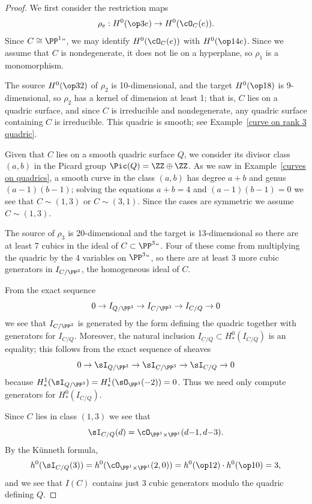 \begin{proof}
We first consider the restriction maps
$$
\rho_e: H^0(\op3e)\to H^0(\cO_C(e)).
$$
Since $C\cong \PP^1` `$,
we may identify $H^0(\cO_C(e))$ with
$H^0(\op1{4e})$.
 Since we assume that $C$ is nondegenerate, it does not lie on a hyperplane,
 so  $\rho_1$ is a monomorphism.

The source $H^0(\op32)$ of $\rho_2$ is 10-dimensional, and the target $H^0(\op18)$ is
9-dimensional, so $\rho_2$ has a kernel of dimension at least 1; that is, $C$ lies on
a quadric surface, and since $C$ is irreducible and nondegenerate, any quadric surface containing
$C$ is irreducible. This quadric is smooth;
see Example~\ref{curve on rank 3 quadric}.


Given that $C$ lies on a smooth quadric surface $Q$, we consider its divisor class $(a,b)$ in the
Picard group $\Pic(Q) = \ZZ\oplus \ZZ$. As we saw in Example~\ref{curves on quadrics}, a smooth curve
in the class $(a,b)$ has degree $a+b$ and genus $(a{-}1)(b{-}1)$;
solving the equations $a+b=4$
and
$(a{-}1)(b{-}1)=0$ we see that $C\sim (1,3)$ or $C\sim (3,1)$. Since the cases
are symmetric we assume $C\sim(1,3)$.

The source of $\rho_3$ is 20-dimensional and the target is
13-dimensional so there are at least 7
cubics in the ideal of $C\subset \PP^3` `$. Four of these come from multiplying the quadric
by the 4 variables on $\PP^3` `$, so there are at least 3 more cubic generators in $I_{C/\PP^3}$,
 the homogeneous ideal of $C$.

From the exact sequence
$$
0\to I_{Q/\PP^3} \to I_{C/\PP^3} \to I_{C/Q} \to 0
$$
we see that $I_{C/\PP^3}$ is generated by the form defining the quadric
together with generators for $I_{C/Q}$. Moreover,
the natural inclusion $I_{C/Q}\subset H^{0}_{*}(I_{C/Q})$ is an equality; this follows from the exact sequence of sheaves
$$
0\to \sI_{Q/\PP^3} \to \sI_{C/\PP^3} \to \sI_{C/Q} \to 0
$$
because $H^{1}_{*}(\sI_{Q/\PP^3}) = H^{1}_{*}(\sO_{\PP^3}(-2)) = 0$.
Thus we need only compute generators for $H^{0}_{*}(I_{C/Q})$.

Since $C$ lies in class $(1,3)$ we see that
$$
\sI_{C/Q}(d) = \cO_{\PP^1\times \PP^1}(d{-}1, d{-}3)
.
$$
By the K\"unneth formula,
$$
h^0(\sI_{C/Q}(3)) = h^0(\cO_{\PP^1\times \PP^1}(2, 0)) = h^0(\op12)\cdot h^0(\op10) = 3,
$$
and we see that $I(C)$ contains just 3 cubic generators modulo the quadric defining $Q$.


\end{proof}
